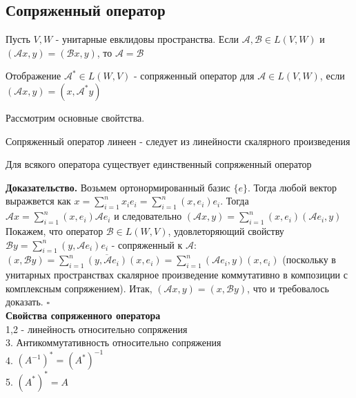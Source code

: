 \subsection{Сопряженный оператор}
Пусть $V,W$ - унитарные евклидовы пространства. Если $\mathcal{A,B}\in L(V,W)$
и $(\mathcal Ax,y)=(\mathcal Bx,y)$, то $\mathcal{A=B}$
\begin{defin}
Отображение $\mathcal A^*\in L(W,V)$ - сопряженный оператор для $\mathcal{A}
\in L(V,W)$, если $(\mathcal Ax,y)=(x,\mathcal A^*y)$
\end{defin}
Рассмотрим основные свойтства.
\begin{theor}
Сопряженный оператор линеен - следует из линейности скалярного произведения
\end{theor}
\begin{theor}
Для всякого оператора существует единственный сопряженный оператор
\end{theor}
\textbf{Доказательство.} Возьмем ортонормированный базис $\{e\}$. Тогда любой
вектор выражвется как $x=\sum\limits^{n}_{i=1}x_ie_i=\sum\limits^{n}_{i=1}
(x,e_i)e_i$. Тогда $\mathcal Ax=\sum\limits^{n}_{i=1}(x,e_i)\mathcal Ae_i$ и
следовательно $(\mathcal Ax,y)=\sum\limits^{n}_{i=1}(x,e_i)(\mathcal Ae_i,y)$
Покажем, что оператор $\mathcal B\in L(W,V)$, удовлеторяющий свойству $\mathcal
By=\sum\limits^{n}_{i=1}(y,\mathcal Ae_i)e_i$ - сопряженный к $\mathcal A$:
$(x,\mathcal By)=\sum\limits^{n}_{i=1}\overline{(y,\mathcal Ae_i)}(x,e_i)=
\sum\limits^{n}_{i=1}(\mathcal Ae_i,y)(x,e_i)$ (поскольку в унитарных 
пространствах скалярное произведение коммутативно в композиции с комплексным 
сопряжением). Итак, $(\mathcal Ax,y)=(x,\mathcal By)$, что и требовалось 
доказать. $\square$\\
\textbf{Свойства сопряженного оператора}\\
1,2 - линейность относительно сопряжения\\
3. Антикоммутативность относительно сопряжения\\
4. $(A^{-1})^*=(A^*)^{-1}$\\
5. $(A^*)^*=A$


